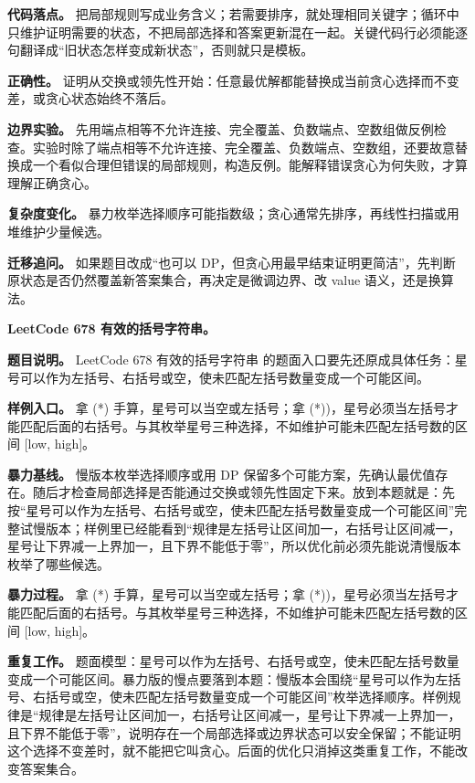 \textbf{代码落点。} 把局部规则写成业务含义；若需要排序，就处理相同关键字；循环中只维护证明需要的状态，不把局部选择和答案更新混在一起。关键代码行必须能逐句翻译成“旧状态怎样变成新状态”，否则就只是模板。

\textbf{正确性。} 证明从交换或领先性开始：任意最优解都能替换成当前贪心选择而不变差，或贪心状态始终不落后。

\textbf{边界实验。} 先用端点相等不允许连接、完全覆盖、负数端点、空数组做反例检查。实验时除了端点相等不允许连接、完全覆盖、负数端点、空数组，还要故意替换成一个看似合理但错误的局部规则，构造反例。能解释错误贪心为何失败，才算理解正确贪心。

\textbf{复杂度变化。} 暴力枚举选择顺序可能指数级；贪心通常先排序，再线性扫描或用堆维护少量候选。

\textbf{迁移追问。} 如果题目改成“也可以 DP，但贪心用最早结束证明更简洁”，先判断原状态是否仍然覆盖新答案集合，再决定是微调边界、改 value 语义，还是换算法。

\noindent\textbf{LeetCode 678 有效的括号字符串。}

\textbf{题目说明。} LeetCode 678 有效的括号字符串 的题面入口要先还原成具体任务：星号可以作为左括号、右括号或空，使未匹配左括号数量变成一个可能区间。

\textbf{样例入口。} 拿 (*) 手算，星号可以当空或左括号；拿 (*))，星号必须当左括号才能匹配后面的右括号。与其枚举星号三种选择，不如维护可能未匹配左括号数的区间 [low, high]。

\textbf{暴力基线。} 慢版本枚举选择顺序或用 DP 保留多个可能方案，先确认最优值存在。随后才检查局部选择是否能通过交换或领先性固定下来。放到本题就是：先按“星号可以作为左括号、右括号或空，使未匹配左括号数量变成一个可能区间”完整试慢版本；样例里已经能看到“规律是左括号让区间加一，右括号让区间减一，星号让下界减一上界加一，且下界不能低于零”，所以优化前必须先能说清慢版本枚举了哪些候选。

\textbf{暴力过程。} 拿 (*) 手算，星号可以当空或左括号；拿 (*))，星号必须当左括号才能匹配后面的右括号。与其枚举星号三种选择，不如维护可能未匹配左括号数的区间 [low, high]。

\textbf{重复工作。} 题面模型：星号可以作为左括号、右括号或空，使未匹配左括号数量变成一个可能区间。暴力版的慢点要落到本题：慢版本会围绕“星号可以作为左括号、右括号或空，使未匹配左括号数量变成一个可能区间”枚举选择顺序。样例规律是“规律是左括号让区间加一，右括号让区间减一，星号让下界减一上界加一，且下界不能低于零”，说明存在一个局部选择或边界状态可以安全保留；不能证明这个选择不变差时，就不能把它叫贪心。后面的优化只消掉这类重复工作，不能改变答案集合。

